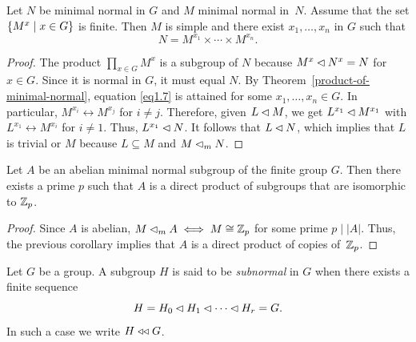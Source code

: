 \begin{cor}\label{minimal-normal-of-minimal-normal}
    Let\/ $N$ be minimal normal in\/ $G$ and\/ $M$ minimal normal in\/~$N$. Assume that the set\/ $\{M^x \mid x \in G\}$ is finite. Then\/ $M$ is simple and there exist\/ $x_1, \dots, x_n$ in\/ $G$ such that
    \begin{equation}\label{eq1.7}
        N = M^{x_1} \times \cdots \times M^{x_n}.
    \end{equation}
\end{cor}

\begin{proof}
    The product $\prod_{x\in G}M^x$ is a subgroup of $N$ because $M^x\lhd N^x=N$ for $x\in G$. Since it is normal in\/ $G$, it must equal\/ $N$. By Theorem~\ref{product-of-minimal-normal}, equation \eqref{eq1.7} is attained for some\/ $x_1,\dots,x_n\in G$. In particular, $M^{x_i}\leftrightarrow M^{x_j}$ for $i\ne j$. Therefore, given $L\lhd M$, we get $L^{x_1}\lhd M^{x_1}$ with $L^{x_1}\leftrightarrow M^{x_i}$ for $i\ne 1$. Thus, $L^{x_1}\lhd N$. It follows that $L\lhd N$, which implies that $L$ is trivial or $M$ because $L\subseteq M$ and $M\lhd_mN$.
\end{proof}

\begin{cor}\label{abelian-minimal-normal-is-elementary}
    Let\/ $A$ be an abelian minimal normal subgroup of the finite group\/ $G$. Then there exists a prime\/ $p$ such that\/ $A$ is a direct product of subgroups that are isomorphic to\/ $\mathbb{Z}_p$.
\end{cor}

\begin{proof}
    Since $A$ is abelian, $M\lhd_mA\iff M\cong\mathbb{Z}_p$ for some prime $p\mid|A|$. Thus, the previous corollary implies that $A$ is a direct product of copies of~$\mathbb{Z}_p$.
\end{proof}

\begin{defn}
    Let\/ $G$ be a group. A subgroup\/ $H$ is said to be \textsl{subnormal} in\/ $G$ when there exists a finite sequence
    $$
        H = H_0 \lhd H_1 \lhd \cdots \lhd H_r = G.
    $$
    In such a case we write $H\mathrel{\triangleleft\triangleleft} G$.
\end{defn}

